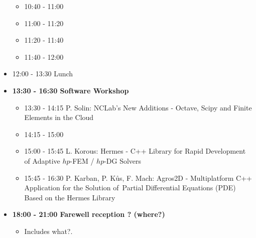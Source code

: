 \documentclass[10pt, A4]{article}%
\begin{document}
\begin{itemize}
  \begin{itemize}
    \item 10:40 - 11:00 
    \item 11:00 - 11:20 
    \item 11:20 - 11:40 
    \item 11:40 - 12:00 
  \end{itemize}
  \item 12:00 - 13:30 Lunch
  \item {\bf 13:30 - 16:30 Software Workshop}
  \begin{itemize}
    \item 13:30 - 14:15 P. Solin: NCLab's New Additions - Octave, Scipy and Finite Elements in the Cloud
    \item 14:15 - 15:00 
    \item 15:00 - 15:45 L. Korous: Hermes - C++ Library for Rapid Development of Adaptive $hp$-FEM / $hp$-DG Solvers
    \item 15:45 - 16:30 P. Karban, P. K\r{u}s, F. Mach: Agros2D - Multiplatform C++ Application for the Solution of~Partial Differential Equations (PDE) Based on the Hermes Library
  \end{itemize}
  \item {\bf 18:00 - 21:00 Farewell reception ? (where?)}
    \begin{itemize}
     \item Includes what?.  
    \end{itemize} 
\end{itemize}


\newpage
\end{document}
